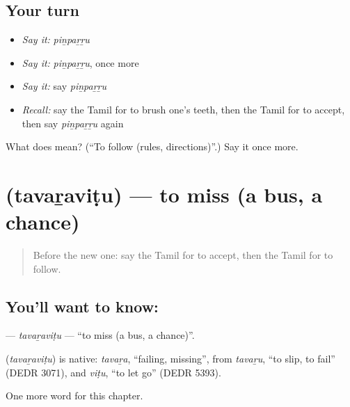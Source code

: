 \subsection*{Your turn}
\begin{itemize}
\raggedright
  \item \emph{Say it:} \emph{piṉpaṟṟu}
  \item \emph{Say it:} \emph{piṉpaṟṟu}, once more
  \item \emph{Say it:} say \emph{piṉpaṟṟu}
  \item \emph{Recall:} say the Tamil for to brush one's teeth, then the Tamil for to accept, then say \emph{piṉpaṟṟu} again
\end{itemize}

\begin{tcolorbox}[breakable,colback=teal!4,colframe=teal!35!black,title={Before you move on}]
What does  mean? (\textquotedblleft{}To follow (rules, directions)\textquotedblright{}.) Say it once more.
\end{tcolorbox}
\section[\texorpdfstring{\ta{தவறவிடு} (tavaṟaviṭu)}{தவறவிடு (tavaṟaviṭu)}]{ (tavaṟaviṭu) — to miss (a bus, a chance)}

\label{lesson:TA-C256-tavaravitu}



\begin{quote}
Before the new one: say the Tamil for to accept, then the Tamil for to follow.
\end{quote}

\subsection*{You'll want to know: }
\textbf{} — \emph{tavaṟaviṭu} — \textquotedblleft{}to miss (a bus, a chance)\textquotedblright{}.

\begin{cousinweb}
\textbf{} (\emph{tavaṟaviṭu}) is native: \emph{tavaṟa}, \textquotedblleft{}failing, missing\textquotedblright{}, from \emph{tavaṟu}, \textquotedblleft{}to slip, to fail\textquotedblright{} (DEDR 3071), and \emph{viṭu}, \textquotedblleft{}to let go\textquotedblright{} (DEDR 5393).
\end{cousinweb}

\begin{grammarlens}[title={What you've built}]
One more word for this chapter.
\end{grammarlens}

